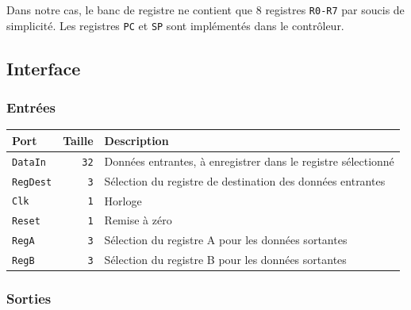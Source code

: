 \documentclass{article}
\begin{document}
    Dans notre cas, le banc de registre ne contient que 8 registres \texttt{R0-R7} par soucis de simplicité.
    Les registres \texttt{PC} et \texttt{SP} sont implémentés dans le contrôleur.

    \subsection{Interface}

    \subsubsection{Entrées}

    \begin{tabular}{|l|r|l|}
        \hline
        \textbf{Port}    & \textbf{Taille} & \textbf{Description}                                          \\
        \hline

        \texttt{DataIn}  & \texttt{32}     & Données entrantes, à enregistrer dans le registre sélectionné \\
        \hline
        \texttt{RegDest} & \texttt{3}      & Sélection du registre de destination des données entrantes    \\
        \hline
        \texttt{Clk}     & \texttt{1}      & Horloge                                                       \\
        \hline
        \texttt{Reset}   & \texttt{1}      & Remise à zéro                                                 \\
        \hline
        \texttt{RegA}    & \texttt{3}      & Sélection du registre A pour les données sortantes            \\
        \hline
        \texttt{RegB}    & \texttt{3}      & Sélection du registre B pour les données sortantes            \\

        \hline
    \end{tabular}

    \subsubsection{Sorties}
\end{document}
